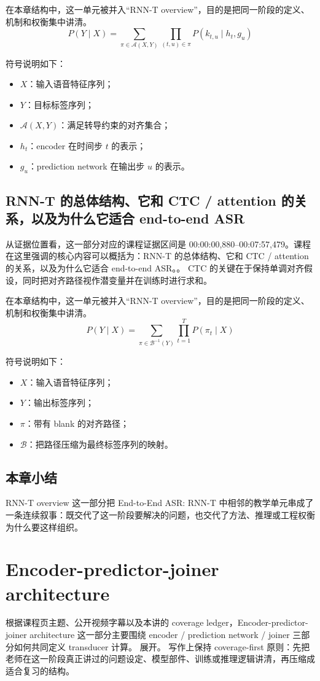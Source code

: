 \documentclass[a4paper]{article}
\begin{document}
在本章结构中，这一单元被并入“RNN-T overview”，目的是把同一阶段的定义、机制和权衡集中讲清。
\[
P(Y \mid X) = \sum_{\pi \in \mathcal{A}(X,Y)} \prod_{(t,u)\in\pi} P(k_{t,u} \mid h_t, g_u)
\]

符号说明如下：
\begin{itemize}
\item $X$：输入语音特征序列；
\item $Y$：目标标签序列；
\item $\mathcal{A}(X,Y)$：满足转导约束的对齐集合；
\item $h_t$：encoder 在时间步 $t$ 的表示；
\item $g_u$：prediction network 在输出步 $u$ 的表示。
\end{itemize}

\subsection{RNN-T 的总体结构、它和 CTC / attention 的关系，以及为什么它适合 end-to-end ASR}
从证据位置看，这一部分对应的课程证据区间是 00:00:00,880--00:07:57,479。课程在这里强调的核心内容可以概括为：RNN-T 的总体结构、它和 CTC / attention 的关系，以及为什么它适合 end-to-end ASR。。
CTC 的关键在于保持单调对齐假设，同时把对齐路径视作潜变量并在训练时进行求和。

在本章结构中，这一单元被并入“RNN-T overview”，目的是把同一阶段的定义、机制和权衡集中讲清。
\[
P(Y \mid X) = \sum_{\pi \in \mathcal{B}^{-1}(Y)} \prod_{t=1}^{T} P(\pi_t \mid X)
\]

符号说明如下：
\begin{itemize}
\item $X$：输入语音特征序列；
\item $Y$：输出标签序列；
\item $\pi$：带有 blank 的对齐路径；
\item $\mathcal{B}$：把路径压缩为最终标签序列的映射。
\end{itemize}

\subsection{本章小结}
RNN-T overview 这一部分把 End-to-End ASR: RNN-T 中相邻的教学单元串成了一条连续叙事：既交代了这一阶段要解决的问题，也交代了方法、推理或工程权衡为什么要这样组织。

\section{Encoder-predictor-joiner architecture}
根据课程页主题、公开视频字幕以及本讲的 coverage ledger，Encoder-predictor-joiner architecture 这一部分主要围绕 encoder / prediction network / joiner 三部分如何共同定义 transducer 计算。 展开。
写作上保持 coverage-first 原则：先把老师在这一阶段真正讲过的问题设定、模型部件、训练或推理逻辑讲清，再压缩成适合复习的结构。
\end{document}
